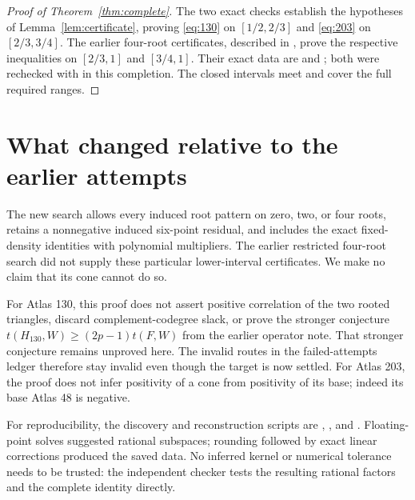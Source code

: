 \documentclass[11pt]{article}
\begin{document}
\begin{proof}[Proof of Theorem~\ref{thm:complete}]
The two exact checks establish the hypotheses of
Lemma~\ref{lem:certificate}, proving \eqref{eq:130} on $[1/2,2/3]$ and
\eqref{eq:203} on $[2/3,3/4]$.
The earlier four-root certificates, described in
, prove the respective
inequalities on $[2/3,1]$ and $[3/4,1]$.  Their exact data are
 and
; both were
rechecked with  in this completion.
The closed intervals meet and cover the full required ranges.
\end{proof}

\section{What changed relative to the earlier attempts}

The new search allows every induced root pattern on zero, two, or four
roots, retains a nonnegative induced six-point residual, and includes the
exact fixed-density identities with polynomial multipliers.  The earlier
restricted four-root search did not supply these particular lower-interval
certificates.  We make no claim that its cone cannot do so.

For Atlas 130, this proof does not assert positive correlation of the two
rooted triangles, discard complement-codegree slack, or prove the stronger
conjecture $t(H_{130},W)\ge(2p-1)t(F,W)$ from the earlier operator note.
That stronger conjecture remains unproved here.  The invalid routes in the
failed-attempts ledger therefore stay invalid even though the target is now
settled.  For Atlas 203, the proof does not infer positivity of a cone from
positivity of its base; indeed its base Atlas 48 is negative.

For reproducibility, the discovery and reconstruction scripts are
,
, and
.  Floating-point solves
suggested rational subspaces; rounding followed by exact linear corrections
produced the saved data.  No inferred kernel or numerical tolerance needs
to be trusted: the independent checker tests the resulting rational factors
and the complete identity directly.
\end{document}
